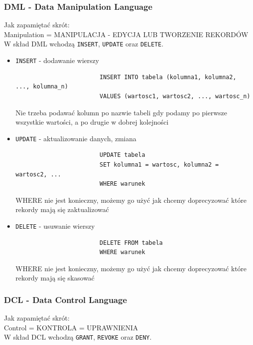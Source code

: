 \documentclass[a4paper,12pt,oneside]{book}
\begin{document}
				\subsubsection{DML - Data Manipulation Language}
				\noindent Jak zapamiętać skrót: \\ Manipulation = MANIPULACJA - EDYCJA LUB TWORZENIE REKORDÓW \\
				\noindent W skład DML wchodzą \verb*|INSERT|, \verb*|UPDATE| oraz \verb*|DELETE|.
				\begin{itemize}
					\itemsep 0em
					\item \verb*|INSERT| - dodawanie wierszy
					\begin{verbatim}
						INSERT INTO tabela (kolumna1, kolumna2, ..., kolumna_n)
						VALUES (wartosc1, wartosc2, ..., wartosc_n)
					\end{verbatim}
					Nie trzeba podawać kolumn po nazwie tabeli gdy podamy po pierwsze wszystkie wartości, a po drugie w dobrej kolejności
					
					\item \verb*|UPDATE| - aktualizowanie danych, zmiana
					\begin{verbatim}
						UPDATE tabela
						SET kolumna1 = wartosc, kolumna2 = wartosc2, ...
						WHERE warunek
					\end{verbatim}
					WHERE nie jest konieczny, możemy  go użyć jak chcemy doprecyzować które rekordy mają się zaktualizować
					
					\item \verb*|DELETE| - usuwanie wierszy
					\begin{verbatim}
						DELETE FROM tabela
						WHERE warunek
					\end{verbatim}
					WHERE nie jest konieczny, możemy  go użyć jak chcemy doprecyzować które rekordy mają się skasować
				\end{itemize}
				\subsubsection{DCL - Data Control Language}
				\noindent Jak zapamiętać skrót: \\ Control = KONTROLA = UPRAWNIENIA \\
				\noindent W skład DCL wchodzą \verb*|GRANT|, \verb*|REVOKE| oraz \verb*|DENY|.
				
\end{document}
